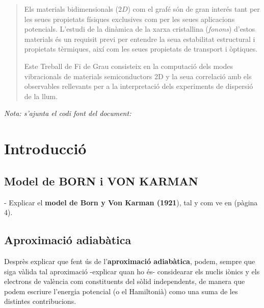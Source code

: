\documentclass[12pt,twoside,a4paper, notitlepage]{article}%
\author{Casimiro Victoria Castillo}
\begin{document}



\begin{abstract}
  Els materials bidimensionals ($2D$) com el grafé són de gran interés tant per les seues propietats físiques exclusives com per les seues aplicacions potencials. L'estudi de la dinàmica de la xarxa cristallina (\textit{fonons}) d'estos materials és un requisit previ per entendre la seua estabilitat estructural i propietats tèrmiques, així com les seues propietats de transport i òptiques.   


  Este Treball de Fi de Grau consisteix en la computació dels modes vibracionals de materials semiconductors 2D y la seua correlació amb els observables rellevants per a la interpretació dels experiments de dispersió de la llum.
\end{abstract}

\textit{Nota: s'ajunta el codi font del document: }

\newpage

\section{Introducció}


\subsection{Model de BORN i VON KARMAN}
- Explicar el \textbf{model de  Born y  Von Karman (1921}), tal y com ve en \cite{Balkanski_2000} \cite{brueesch82_phonon} (pàgina 4).


\subsection{Aproximació adiabàtica}
Desprès explicar que fent ús de l'\textbf{aproximació adiabàtica}, podem, sempre que siga vàlida tal aproximació -explicar quan ho és- considearar els nuclis iònics y els electrons de valència com constituents del sòlid independents, de manera que podem escriure l'energia potencial (o el Hamiltonià) como una suma de les distintes contribucions.
  
\end{document}
